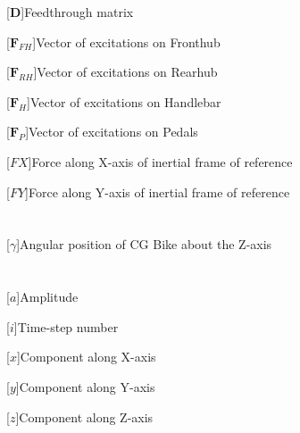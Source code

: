 \begin{acronym}[LONGEST]
	[\ensuremath{\mathbf{D}}]{\acrounit{-}Feedthrough matrix}
\end{acronym}
\begin{acronym}[LONGEST]
	[\ensuremath{\mathbf{F}_{FH}}]{\acrounit{\N}Vector of excitations on Fronthub}
\end{acronym}
\begin{acronym}[LONGEST]
	[\ensuremath{\mathbf{F}_{RH}}]{\acrounit{\N}Vector of excitations on Rearhub}
\end{acronym}
\begin{acronym}[LONGEST]
	[\ensuremath{\mathbf{F}_{H}}]{\acrounit{\N}Vector of excitations on Handlebar}
\end{acronym}
\begin{acronym}[LONGEST]
	[\ensuremath{\mathbf{F}_{P}}]{\acrounit{\N}Vector of excitations on Pedals}
\end{acronym}
\begin{acronym}[LONGEST]
	[\ensuremath{FX}]{\acrounit{\N}Force along X-axis of inertial frame of reference}
\end{acronym}
\begin{acronym}[LONGEST]
	[\ensuremath{FY}]{\acrounit{\N}Force along Y-axis of inertial frame of reference}
\end{acronym}


\section*{}
\begin{acronym}[LONGEST]
[\ensuremath{\gamma}]{Angular position of CG Bike about the Z-axis}
\end{acronym}

\section*{}
\begin{acronym}[LONGEST]
[\ensuremath{a}]{Amplitude}
\end{acronym}
\begin{acronym}[LONGEST]
	[\ensuremath{i}]{Time-step number}
\end{acronym}
\begin{acronym}[LONGEST]
	[\ensuremath{x}]{Component along X-axis}
\end{acronym}
\begin{acronym}[LONGEST]
	[\ensuremath{y}]{Component along Y-axis}
\end{acronym}
\begin{acronym}[LONGEST]
	[\ensuremath{z}]{Component along Z-axis}
\end{acronym}
